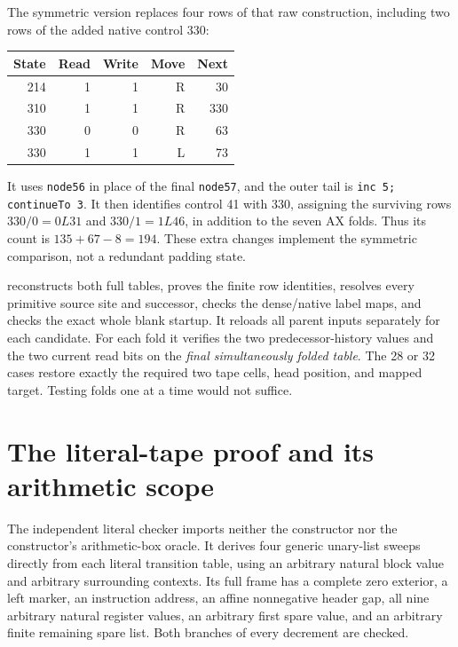 \documentclass[10pt,letterpaper]{article}
\newcommand{\file}[1]{\texttt{\path{#1}}}
\begin{document}
The symmetric version replaces four rows of that raw construction,
including two rows of the added native control 330:
\begin{center}
\begin{tabular}{rrrrr}\toprule
State&Read&Write&Move&Next\\\midrule
214&1&1&R&30\\310&1&1&R&330\\330&0&0&R&63\\330&1&1&L&73\\\bottomrule
\end{tabular}
\end{center}
It uses \texttt{node56} in place of the final \texttt{node57}, and
the outer tail is \texttt{inc 5; continueTo 3}. It then identifies control
41 with 330, assigning the surviving rows $330/0=0L31$ and
$330/1=1L46$, in addition to the seven AX folds. Thus its count is
$135+67-8=194$. These extra changes implement the symmetric comparison,
not a redundant padding state.

\file{construction/build.py} reconstructs both full tables, proves the
finite row identities, resolves every primitive source site and successor,
checks the dense/native label maps, and checks the exact whole blank
startup. It reloads all parent inputs separately for each candidate.
For each fold it verifies the two predecessor-history values and the two
current read bits on the \emph{final simultaneously folded table}. The
28 or 32 cases restore exactly the required two tape cells, head position,
and mapped target. Testing folds one at a time would not suffice.



\section{The literal-tape proof and its arithmetic scope}
\label{sec:physical}

The independent literal checker imports neither the constructor nor the
constructor's arithmetic-box oracle. It derives four generic unary-list
sweeps directly from each literal transition table, using an arbitrary
natural block value and arbitrary surrounding contexts. Its full frame
has a complete zero exterior, a left marker, an instruction address, an
affine nonnegative header gap, all nine arbitrary natural register values,
an arbitrary first spare value, and an arbitrary finite remaining spare
list. Both branches of every decrement are checked.
\end{document}
